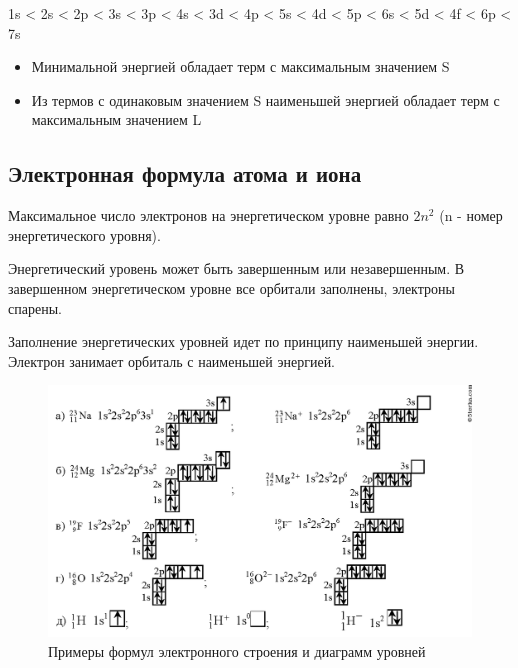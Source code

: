 1s < 2s < 2p < 3s < 3p < 4s < 3d < 4p < 5s < 4d < 5p < 6s < 5d < 4f < 6p < 7s

 
 \begin{itemize}
     \item Минимальной энергией обладает терм с максимальным значением S
     \item Из термов с одинаковым значением S наименьшей энергией обладает терм с максимальным значением L
 \end{itemize}
 
 \subsection{Электронная формула атома и иона}
 
 Максимальное число электронов на энергетическом уровне равно $2n^2$ (n - номер энергетического уровня).
 
 Энергетический уровень может быть завершенным или незавершенным. В завершенном энергетическом уровне все орбитали заполнены, электроны спарены.

Заполнение энергетических уровней идет по принципу наименьшей энергии. Электрон занимает орбиталь с наименьшей энергией.

\begin{figure}[H]
    \centering
    \includegraphics[width = \textwidth]{TeX/Pictures/7_atom.png}
    \caption{Примеры формул электронного строения и диаграмм уровней}
    \label{fig:7atom}
\end{figure}

